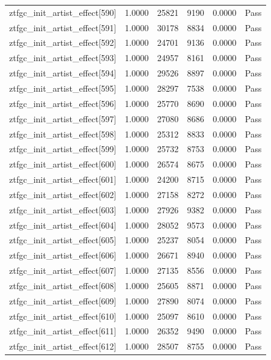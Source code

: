 \begin{table}[htbp]
\begin{tabular}{llrrll}
ztfgc\_init\_artist\_effect[590] & 1.0000 & 25821 & 9190 & 0.0000 & Pass \\
ztfgc\_init\_artist\_effect[591] & 1.0000 & 30178 & 8834 & 0.0000 & Pass \\
ztfgc\_init\_artist\_effect[592] & 1.0000 & 24701 & 9136 & 0.0000 & Pass \\
ztfgc\_init\_artist\_effect[593] & 1.0000 & 24957 & 8161 & 0.0000 & Pass \\
ztfgc\_init\_artist\_effect[594] & 1.0000 & 29526 & 8897 & 0.0000 & Pass \\
ztfgc\_init\_artist\_effect[595] & 1.0000 & 28297 & 7538 & 0.0000 & Pass \\
ztfgc\_init\_artist\_effect[596] & 1.0000 & 25770 & 8690 & 0.0000 & Pass \\
ztfgc\_init\_artist\_effect[597] & 1.0000 & 27080 & 8686 & 0.0000 & Pass \\
ztfgc\_init\_artist\_effect[598] & 1.0000 & 25312 & 8833 & 0.0000 & Pass \\
ztfgc\_init\_artist\_effect[599] & 1.0000 & 25732 & 8753 & 0.0000 & Pass \\
ztfgc\_init\_artist\_effect[600] & 1.0000 & 26574 & 8675 & 0.0000 & Pass \\
ztfgc\_init\_artist\_effect[601] & 1.0000 & 24200 & 8715 & 0.0000 & Pass \\
ztfgc\_init\_artist\_effect[602] & 1.0000 & 27158 & 8272 & 0.0000 & Pass \\
ztfgc\_init\_artist\_effect[603] & 1.0000 & 27926 & 9382 & 0.0000 & Pass \\
ztfgc\_init\_artist\_effect[604] & 1.0000 & 28052 & 9573 & 0.0000 & Pass \\
ztfgc\_init\_artist\_effect[605] & 1.0000 & 25237 & 8054 & 0.0000 & Pass \\
ztfgc\_init\_artist\_effect[606] & 1.0000 & 26671 & 8940 & 0.0000 & Pass \\
ztfgc\_init\_artist\_effect[607] & 1.0000 & 27135 & 8556 & 0.0000 & Pass \\
ztfgc\_init\_artist\_effect[608] & 1.0000 & 25605 & 8871 & 0.0000 & Pass \\
ztfgc\_init\_artist\_effect[609] & 1.0000 & 27890 & 8074 & 0.0000 & Pass \\
ztfgc\_init\_artist\_effect[610] & 1.0000 & 25097 & 8610 & 0.0000 & Pass \\
ztfgc\_init\_artist\_effect[611] & 1.0000 & 26352 & 9490 & 0.0000 & Pass \\
ztfgc\_init\_artist\_effect[612] & 1.0000 & 28507 & 8755 & 0.0000 & Pass \\

\end{tabular}
\end{table}
